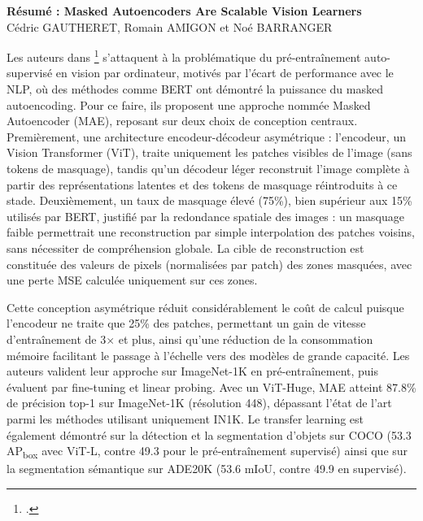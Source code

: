 \begin{center}
    \large \textbf{Résumé : Masked Autoencoders Are Scalable Vision Learners} \\
    \vspace{0.5cm}
    Cédric GAUTHERET, Romain AMIGON et Noé BARRANGER
\end{center}

Les auteurs dans \footcite{mae22} s'attaquent à la problématique du pré-entraînement auto-supervisé en vision par ordinateur, motivés par l'écart de performance avec le NLP, où des méthodes comme BERT ont démontré la puissance du masked autoencoding. Pour ce faire, ils proposent une approche nommée Masked Autoencoder (MAE), reposant sur deux choix de conception centraux. Premièrement, une architecture encodeur-décodeur asymétrique : l'encodeur, un Vision Transformer (ViT), traite uniquement les patches visibles de l'image (sans tokens de masquage), tandis qu'un décodeur léger reconstruit l'image complète à partir des représentations latentes et des tokens de masquage réintroduits à ce stade. Deuxièmement, un taux de masquage élevé (75\%), bien supérieur aux 15\% utilisés par BERT, justifié par la redondance spatiale des images : un masquage faible permettrait une reconstruction par simple interpolation des patches voisins, sans nécessiter de compréhension globale. La cible de reconstruction est constituée des valeurs de pixels (normalisées par patch) des zones masquées, avec une perte MSE calculée uniquement sur ces zones.

Cette conception asymétrique réduit considérablement le coût de calcul puisque l'encodeur ne traite que 25\% des patches, permettant un gain de vitesse d'entraînement de 3$\times$ et plus, ainsi qu'une réduction de la consommation mémoire facilitant le passage à l'échelle vers des modèles de grande capacité. Les auteurs valident leur approche sur ImageNet-1K en pré-entraînement, puis évaluent par fine-tuning et linear probing. Avec un ViT-Huge, MAE atteint 87.8\% de précision top-1 sur ImageNet-1K (résolution 448), dépassant l'état de l'art parmi les méthodes utilisant uniquement IN1K. Le transfer learning est également démontré sur la détection et la segmentation d'objets sur COCO (53.3 AP\textsubscript{box} avec ViT-L, contre 49.3 pour le pré-entraînement supervisé) ainsi que sur la segmentation sémantique sur ADE20K (53.6 mIoU, contre 49.9 en supervisé).

